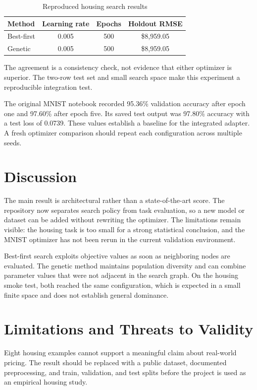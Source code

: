 \documentclass[conference]{IEEEtran}
\begin{document}
\begin{table}[t]
\caption{Reproduced housing search results}
\centering
\begin{tabular}{@{}lccc@{}}
\toprule
Method & Learning rate & Epochs & Holdout RMSE \\
\midrule
Best-first & 0.005 & 500 & \$8,959.05 \\
Genetic & 0.005 & 500 & \$8,959.05 \\
\bottomrule
\end{tabular}
\label{tab:housing-results}
\end{table}

The agreement is a consistency check, not evidence that either optimizer is superior. The two-row test set and small search space make this experiment a reproducible integration test.

The original MNIST notebook recorded 95.36\% validation accuracy after epoch one and 97.60\% after epoch five. Its saved test output was 97.80\% accuracy with a test loss of 0.0739. These values establish a baseline for the integrated adapter. A fresh optimizer comparison should repeat each configuration across multiple seeds.

\section{Discussion}
The main result is architectural rather than a state-of-the-art score. The repository now separates search policy from task evaluation, so a new model or dataset can be added without rewriting the optimizer. The limitations remain visible: the housing task is too small for a strong statistical conclusion, and the MNIST optimizer has not been rerun in the current validation environment.

Best-first search exploits objective values as soon as neighboring nodes are evaluated. The genetic method maintains population diversity and can combine parameter values that were not adjacent in the search graph. On the housing smoke test, both reached the same configuration, which is expected in a small finite space and does not establish general dominance.

\section{Limitations and Threats to Validity}
Eight housing examples cannot support a meaningful claim about real-world pricing. The result should be replaced with a public dataset, documented preprocessing, and train, validation, and test splits before the project is used as an empirical housing study.
\end{document}
